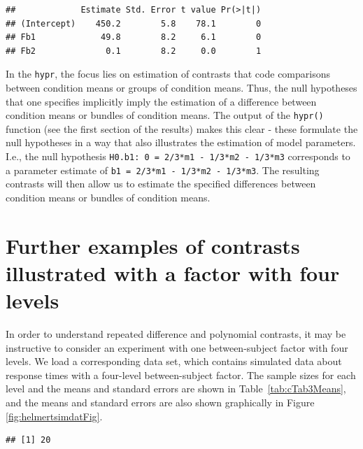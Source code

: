 \documentclass[
  12pt,
]{krantz}
\newenvironment{Shaded}{\begin{snugshade}}{\end{snugshade}}
\newcommand{\DecValTok}[1]{\textcolor[rgb]{0.00,0.00,0.81}{#1}}
\newcommand{\FunctionTok}[1]{\textcolor[rgb]{0.00,0.00,0.00}{#1}}
\newcommand{\NormalTok}[1]{#1}
\newcommand{\SpecialCharTok}[1]{\textcolor[rgb]{0.00,0.00,0.00}{#1}}
\theoremstyle{definition}
\theoremstyle{definition}
\theoremstyle{definition}
\theoremstyle{definition}
\theoremstyle{remark}
\begin{document}
\begin{Shaded}
\end{Shaded}

\begin{verbatim}
##             Estimate Std. Error t value Pr(>|t|)
## (Intercept)    450.2        5.8    78.1        0
## Fb1             49.8        8.2     6.1        0
## Fb2              0.1        8.2     0.0        1
\end{verbatim}

In the \texttt{hypr}, the focus lies on estimation of contrasts that code comparisons between condition means or groups of condition means. Thus, the null hypotheses that one specifies implicitly imply the estimation of a difference between condition means or bundles of condition means. The output of the \texttt{hypr()} function (see the first section of the results) makes this clear - these formulate the null hypotheses in a way that also illustrates the estimation of model parameters. I.e., the null hypothesis \texttt{H0.b1:\ 0\ =\ 2/3*m1\ -\ 1/3*m2\ -\ 1/3*m3} corresponds to a parameter estimate of \texttt{b1\ =\ 2/3*m1\ -\ 1/3*m2\ -\ 1/3*m3}. The resulting contrasts will then allow us to estimate the specified differences between condition means or bundles of condition means.

\hypertarget{sec:4levelFactor}{%
\section{Further examples of contrasts illustrated with a factor with four levels}\label{sec:4levelFactor}}

In order to understand repeated difference and polynomial contrasts, it may be instructive to consider an experiment with one between-subject factor with four levels.
We load a corresponding data set, which contains simulated data about response times with a four-level between-subject factor.
The sample sizes for each level and the means and standard errors are shown in Table~\ref{tab:cTab3Means}, and the means and standard errors are also shown graphically in Figure \ref{fig:helmertsimdatFig}.

\begin{verbatim}
## [1] 20
\end{verbatim}
\end{document}

